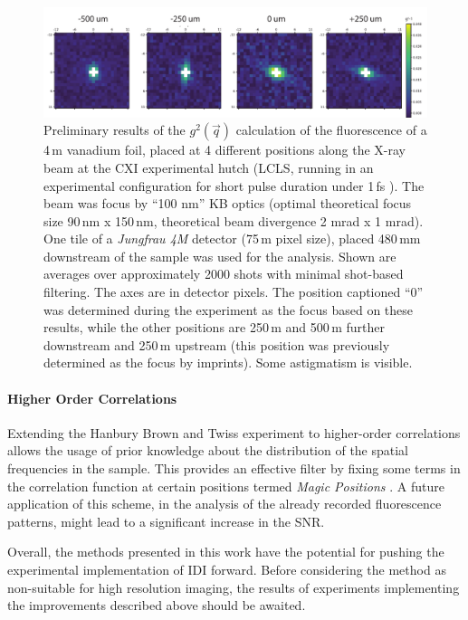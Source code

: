 \begin{figure}[p]
	\centering
	\includegraphics[width=\linewidth]{images/lv65_vanadium.pdf}
	
	\caption[Focus finding using IDI]{Preliminary results of the $g^2(\vec{q})$ calculation of the fluorescence of a 4\,\textmu m vanadium foil, placed at 4 different positions along the X-ray beam at the CXI experimental hutch (LCLS, running in an experimental configuration for short pulse duration under 1\,fs \cite{subfs2017,argosecond}). The beam was focus by \enquote{100 nm} KB optics (optimal theoretical focus size 90\,nm x 150\,nm, theoretical beam divergence 2 mrad x 1 mrad). One tile of a \textit{Jungfrau 4M} detector (75\,\textmu m pixel size), placed 480\,mm downstream of the sample was used for the analysis. Shown are averages over approximately 2000 shots with minimal shot-based filtering. The axes are in detector pixels. The position captioned \enquote{0} was determined during the experiment as the focus based on these results, while the other positions are 250\,\textmu m and 500\,\textmu m further downstream and 250\,\textmu m upstream (this position was previously determined as the focus by imprints).  Some astigmatism is visible.}
	\label{fig:outlook_vanadium}
\end{figure}

\paragraph{Higher Order Correlations}
Extending the Hanbury Brown and Twiss experiment to higher-order correlations allows the usage of prior knowledge about the distribution of the spatial frequencies in the sample. This provides an effective filter by fixing some terms in the correlation function at certain positions termed \textit{Magic Positions} \cite{schneider2018,thiel2007}. A future application of this scheme, in the analysis of the already recorded fluorescence patterns, might lead to a significant increase in the SNR.

\vspace{0.5cm}
Overall, the methods presented in this work have the potential for pushing the experimental implementation of IDI forward. Before considering the method as non-suitable for high resolution imaging, the results of experiments implementing the improvements described above should be awaited.



